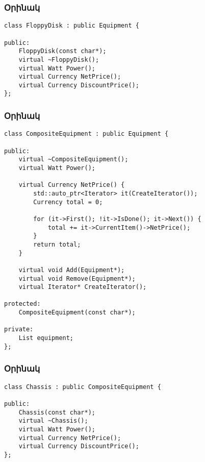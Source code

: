 \documentclass{beamer}
\begin{document}
\begin{frame}[fragile]\frametitle{Օրինակ}
\begin{english}
\begin{verbatim}
class FloppyDisk : public Equipment {

public:
    FloppyDisk(const char*);
    virtual ~FloppyDisk();
    virtual Watt Power();
    virtual Currency NetPrice();
    virtual Currency DiscountPrice();
};
\end{verbatim}
\end{english}
\end{frame}

\begin{frame}[fragile]\frametitle{Օրինակ}
\begin{english}
\begin{verbatim}
class CompositeEquipment : public Equipment {

public:
    virtual ~CompositeEquipment();
    virtual Watt Power();

    virtual Currency NetPrice() {
        std::auto_ptr<Iterator> it(CreateIterator());
        Currency total = 0;

        for (it->First(); !it->IsDone(); it->Next()) {
            total += it->CurrentItem()->NetPrice();
        }
        return total;
    }

    virtual void Add(Equipment*);
    virtual void Remove(Equipment*);
    virtual Iterator* CreateIterator();

protected:
    CompositeEquipment(const char*);

private:
    List equipment;
};
\end{verbatim}
\end{english}
\end{frame}

\begin{frame}[fragile]\frametitle{Օրինակ}
\begin{english}
\begin{verbatim}
class Chassis : public CompositeEquipment {

public:
    Chassis(const char*);
    virtual ~Chassis();
    virtual Watt Power();
    virtual Currency NetPrice();
    virtual Currency DiscountPrice();
};
\end{verbatim}
\end{english}
\end{frame}
\end{document}
